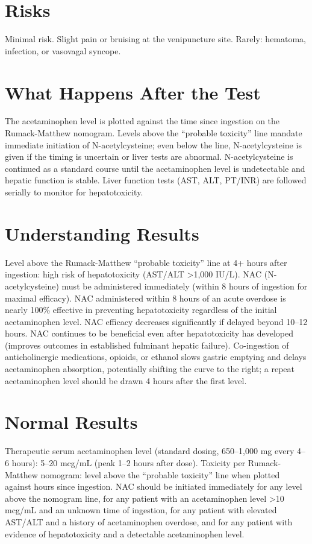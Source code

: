 \section*{Risks}
Minimal risk. Slight pain or bruising at the venipuncture site. Rarely: hematoma, infection, or vasovagal syncope.
\section*{What Happens After the Test}
The acetaminophen level is plotted against the time since ingestion on the Rumack-Matthew nomogram. Levels above the ``probable toxicity'' line mandate immediate initiation of N-acetylcysteine; even below the line, N-acetylcysteine is given if the timing is uncertain or liver tests are abnormal. N-acetylcysteine is continued as a standard course until the acetaminophen level is undetectable and hepatic function is stable. Liver function tests (AST, ALT, PT/INR) are followed serially to monitor for hepatotoxicity.
\section*{Understanding Results}
Level above the Rumack-Matthew ``probable toxicity'' line at 4+ hours after ingestion: high risk of hepatotoxicity (AST/ALT >1,000 IU/L). NAC (N-acetylcysteine) must be administered immediately (within 8 hours of ingestion for maximal efficacy). NAC administered within 8 hours of an acute overdose is nearly 100\% effective in preventing hepatotoxicity regardless of the initial acetaminophen level. NAC efficacy decreases significantly if delayed beyond 10--12 hours. NAC continues to be beneficial even after hepatotoxicity has developed (improves outcomes in established fulminant hepatic failure). Co-ingestion of anticholinergic medications, opioids, or ethanol slows gastric emptying and delays acetaminophen absorption, potentially shifting the curve to the right; a repeat acetaminophen level should be drawn 4 hours after the first level.
\section*{Normal Results}
Therapeutic serum acetaminophen level (standard dosing, 650--1,000 mg every 4--6 hours): 5--20 mcg/mL (peak 1--2 hours after dose). Toxicity per Rumack-Matthew nomogram: level above the ``probable toxicity'' line when plotted against hours since ingestion. NAC should be initiated immediately for any level above the nomogram line, for any patient with an acetaminophen level >10 mcg/mL and an unknown time of ingestion, for any patient with elevated AST/ALT and a history of acetaminophen overdose, and for any patient with evidence of hepatotoxicity and a detectable acetaminophen level.
